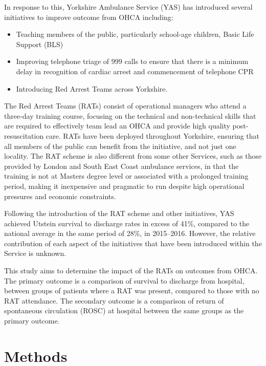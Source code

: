 \documentclass[]{article}
\providecommand{\tightlist}{%
  \setlength{\itemsep}{0pt}\setlength{\parskip}{0pt}}
\theoremstyle{definition}
\theoremstyle{definition}
\theoremstyle{definition}
\theoremstyle{remark}
\begin{document}
In response to this, Yorkshire Ambulance Service (YAS) has introduced
several initiatives to improve outcome from OHCA including:

\begin{itemize}
\tightlist
\item
  Teaching members of the public, particularly school-age children,
  Basic Life Support (BLS)
\item
  Improving telephone triage of 999 calls to ensure that there is a
  minimum delay in recognition of cardiac arrest and commencement of
  telephone CPR
\item
  Introducing Red Arrest Teams across Yorkshire.
\end{itemize}

The Red Arrest Teams (RATs) consist of operational managers who attend a
three-day training course, focusing on the technical and non-technical
skills that are required to effectively team lead an OHCA and provide
high quality post-resuscitation care. RATs have been deployed throughout
Yorkshire, ensuring that all members of the public can benefit from the
initiative, and not just one locality. The RAT scheme is also different
from some other Services, such as those provided by London and South
East Coast ambulance services, in that the training is not at Masters
degree level or associated with a prolonged training period, making it
inexpensive and pragmatic to run despite high operational pressures and
economic constraints.

Following the introduction of the RAT scheme and other initiatives, YAS
achieved Utstein survival to discharge rates in excess of 41\%, compared
to the national average in the same period of 28\%, in 2015--2016.
However, the relative contribution of each aspect of the initiatives
that have been introduced within the Service is unknown.

This study aims to determine the impact of the RATs on outcomes from
OHCA. The primary outcome is a comparison of survival to discharge from
hospital, between groups of patients where a RAT was present, compared
to those with no RAT attendance. The secondary outcome is a comparison
of return of spontaneous circulation (ROSC) at hospital between the same
groups as the primary outcome.

\hypertarget{methods-1}{%
\section{Methods}\label{methods-1}}
\end{document}
